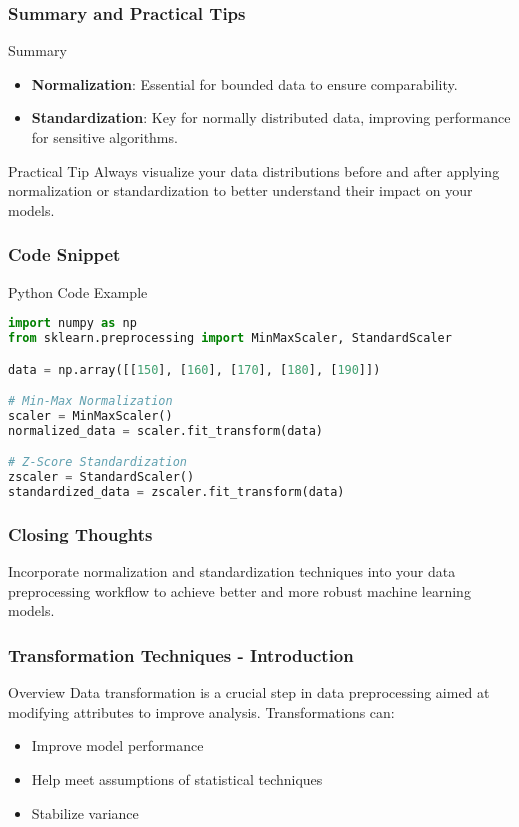 \documentclass[aspectratio=169]{beamer}
\begin{document}
\begin{frame}[fragile]
    \frametitle{Summary and Practical Tips}
    \begin{block}{Summary}
        \begin{itemize}
            \item \textbf{Normalization}: Essential for bounded data to ensure comparability.
            \item \textbf{Standardization}: Key for normally distributed data, improving performance for sensitive algorithms.
        \end{itemize}
    \end{block}
    
    \begin{block}{Practical Tip}
        Always visualize your data distributions before and after applying normalization or standardization to better understand their impact on your models.
    \end{block}
\end{frame}

\begin{frame}[fragile]
    \frametitle{Code Snippet}
    \begin{block}{Python Code Example}
        \begin{lstlisting}[language=Python]
import numpy as np
from sklearn.preprocessing import MinMaxScaler, StandardScaler

data = np.array([[150], [160], [170], [180], [190]])

# Min-Max Normalization
scaler = MinMaxScaler()
normalized_data = scaler.fit_transform(data)

# Z-Score Standardization
zscaler = StandardScaler()
standardized_data = zscaler.fit_transform(data)
        \end{lstlisting}
    \end{block}
\end{frame}

\begin{frame}[fragile]
    \frametitle{Closing Thoughts}
    Incorporate normalization and standardization techniques into your data preprocessing workflow to achieve better and more robust machine learning models.
\end{frame}

\begin{frame}[fragile]
    \frametitle{Transformation Techniques - Introduction}
    \begin{block}{Overview}
        Data transformation is a crucial step in data preprocessing aimed at modifying attributes to improve analysis. Transformations can:
        \begin{itemize}
            \item Improve model performance
            \item Help meet assumptions of statistical techniques
            \item Stabilize variance
        \end{itemize}
    \end{block}
\end{frame}
\end{document}
